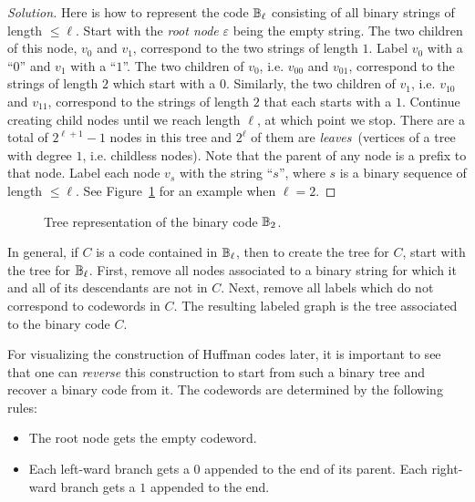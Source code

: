 \begin{proof}[Solution]
Here is how to represent the code $\mathbb{B}_\ell$ consisting of all binary
strings of length $\leq \ell$. Start with the
\emph{root node} $\varepsilon$\index{$\varepsilon$}
being the empty string. The two children of this node, $v_0$ and
$v_1$, correspond to the two strings of length $1$. Label $v_0$ with a
``$0$'' and $v_1$ with a ``$1$''. The two children of $v_0$,
i.e. $v_{00}$ and $v_{01}$, correspond to the strings of length $2$
which start with a $0$. Similarly, the  two children of $v_1$,
i.e. $v_{10}$ and $v_{11}$, correspond to the strings of length $2$
that each starts with a $1$. Continue creating child nodes until we
reach length $\ell$, at which point we stop. There are a total of
$2^{\ell + 1} - 1$ nodes in this tree and $2^\ell$ of them are
\emph{leaves}~(vertices of a tree with degree $1$,
i.e. childless nodes). Note that the parent of any node is a prefix to
that node. Label each node $v_s$ with the string ``$s$'', where $s$ is
a binary sequence of length $\leq \ell$. See
Figure~\ref{fig:trees_forests:tree_representation_B_2} for an example
when $\ell = 2$.
\end{proof}

\begin{figure}[!htbp]
\centering

\caption{Tree representation of the binary code $\mathbb{B}_2$.}
\label{fig:trees_forests:tree_representation_B_2}
\end{figure}

In general, if $C$ is a code contained in $\mathbb{B}_\ell$, then to create
the tree for $C$, start with the tree for $\mathbb{B}_\ell$. First, remove
all nodes associated to a binary string for which it and all of its
descendants are not in $C$. Next, remove all labels which do not
correspond to codewords in $C$. The resulting labeled graph is the
tree associated to the binary code $C$.

For visualizing the construction of Huffman codes later, it is
important to see that one can \emph{reverse} this construction to
start from such a binary tree and recover a binary code from it. The
codewords are determined by the following rules:
%
\begin{itemize}
\item The root node gets the empty codeword.

\item Each left-ward branch gets a $0$ appended to the end of its
  parent. Each right-ward branch gets a $1$ appended to the end.
\end{itemize}


